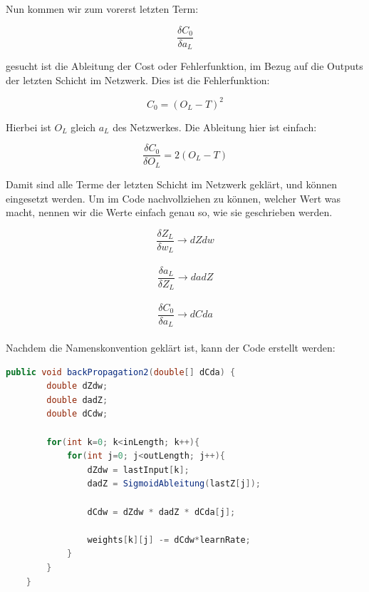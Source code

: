 \documentclass[12pt]{article}
\begin{document}
Nun kommen wir zum vorerst letzten Term:

$$\frac{\delta C_0}{\delta a_L}$$

gesucht ist die Ableitung der Cost oder Fehlerfunktion, im Bezug auf die Outputs der letzten Schicht im Netzwerk. Dies ist die Fehlerfunktion:

$$C_0 = (O_L - T)^2$$

Hierbei ist $O_L$ gleich $a_L$ des Netzwerkes.
Die Ableitung hier ist einfach:

$$\frac{\delta C_0}{\delta O_L} = 2(O_L - T)$$

Damit sind alle Terme der letzten Schicht im Netzwerk geklärt, und können eingesetzt werden.
Um im Code nachvollziehen zu können, welcher Wert was macht, nennen wir die Werte einfach genau so, wie sie geschrieben werden.


$$\frac{\delta Z_L}{\delta w_L} \rightarrow dZdw $$ \\
$$\frac{\delta a_L}{\delta Z_L} \rightarrow dadZ $$ \\
$$\frac{\delta C_0}{\delta a_L} \rightarrow dCda $$ \\

Nachdem die Namenskonvention geklärt ist, kann der Code erstellt werden:

\begin{lstlisting}[language=Java] 
    public void backPropagation2(double[] dCda) {
        double dZdw;
        double dadZ;
        double dCdw;

        for(int k=0; k<inLength; k++){
            for(int j=0; j<outLength; j++){
                dZdw = lastInput[k];
                dadZ = SigmoidAbleitung(lastZ[j]);

                dCdw = dZdw * dadZ * dCda[j];

                weights[k][j] -= dCdw*learnRate;
            }
        }
    }
\end{lstlisting} 
\end{document}
